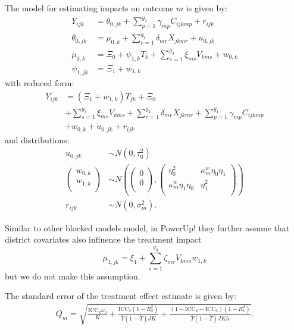 \documentclass[]{article}
\begin{document}
The model for estimating impacts on outcome $m$ is given by: \[
\begin{aligned}
Y_{ijk} &=  \theta_{0,jk} + \sum_{p=1}^{g_{1}} \gamma_{mp} C_{ijkmp} + r_{ijk}\\
 \theta_{0,jk} &= \mu_{0,k} + \sum_{r=1}^{g_{2}} \delta_{mr} X_{jkmr} + u_{0,jk}\\
 \mu_{0,k}  &= \Xi_{0} + \psi_{1,k} T_{k} + \sum_{s=1}^{g_{3}} \xi_{ms} V_{kms} + w_{0,k} \\
 \psi_{1,jk} &= \Xi_{1} + w_{1,k}
\end{aligned}
\] with reduced form: \[
\begin{aligned}
Y_{ijk} &= \left(\Xi_{1} + w_{1,k}\right) T_{jk} + \Xi_{0}\\
 & + \sum_{s=1}^{g_{3}} \xi_{ms} V_{kms} + \sum_{r=1}^{g_{2}} \delta_{mr} X_{jkmr} + \sum_{p=1}^{g_{1}} \gamma_{mp} C_{ijkmp}\\
 &+ w_{0,k} + u_{0,jk} + r_{ijk}
\end{aligned}
\] and distributions: \[
\begin{aligned}
u_{0,jk} &\sim N\left(0, \tau^2_{0}\right)\\
\nonumber \begin{pmatrix} w_{0, k} \\ w_{1,k}\\ \end{pmatrix} &\sim
N\left(\begin{pmatrix} 0 \\ 0\\ \end{pmatrix}, \begin{pmatrix} \eta^2_{0} & \kappa^w_{m} \eta_{0} \eta_{1} \\ \kappa^w_{m} \eta_{1} \eta_{0} & \eta^2_{1} \\ \end{pmatrix}\right) \\
\nonumber r_{ijk} &\sim N\left(0, \sigma^2_m\right).
\end{aligned}
\]

Similar to other blocked models model, in PowerUp! they further assume
that district covariates also influence the treatment impact \[
\mu_{1,jk} = \xi_{1} + \sum_{s=1}^{g_{3}} \zeta_{mr} V_{kms} w_{1,k}
\] but we do not make this assumption.

The standard error of the treatment effect estimate is given by: \[
\begin{aligned}
Q_m = \sqrt{
\frac{\text{ICC}_{3} \omega_{3}}{K} +
\frac{\text{ICC}_{2}(1 - R^2_{2})}{\bar{T}(1 - \bar{T}) J K } +
\frac{(1-\text{ICC}_{2} - \text{ICC}_{3})(1-R^2_{1})}{\bar{T}(1 - \bar{T}) J K\bar{n}} }.\end{aligned}
\]
\end{document}

